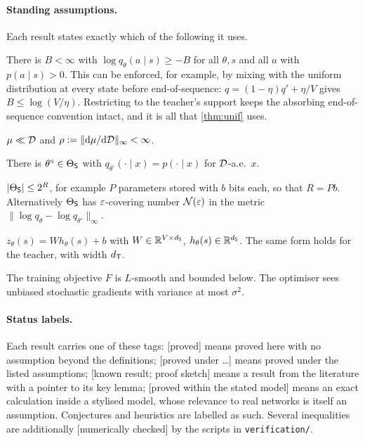 \paragraph{Standing assumptions.}
Each result states exactly which of the following it uses.
\begin{assumption}\label{as:bounded}
There is $B<\infty$ with $\log q_\theta(a\mid s)\ge -B$ for all $\theta,s$ and all $a$ with $p(a\mid s)>0$. This can be
enforced, for example, by mixing with the uniform distribution at every state before end-of-sequence:
$q=(1-\eta)q'+\eta/V$ gives $B\le\log(V/\eta)$. Restricting to the teacher's support keeps the absorbing
end-of-sequence convention intact, and it is all that \cref{thm:unif} uses.
\end{assumption}
\begin{assumption}\label{as:shift}
$\mu\ll\mathcal{D}$ and $\rho:=\|\mathrm d\mu/\mathrm d\mathcal{D}\|_\infty<\infty$.
\end{assumption}
\begin{assumption}[Realisability]\label{as:real}
There is $\theta^\circ\in\Theta_{\mathsf{S}}$ with $q_{\theta^\circ}(\cdot\mid x)=p(\cdot\mid x)$ for $\mathcal{D}$-a.e.\ $x$.
\end{assumption}
\begin{assumption}\label{as:finite}
$|\Theta_{\mathsf{S}}|\le 2^R$, for example $P$ parameters stored with $b$ bits each, so that $R=Pb$. Alternatively
$\Theta_{\mathsf{S}}$ has $\varepsilon$-covering number $\mathcal{N}(\varepsilon)$ in the metric
$\|\log q_\theta-\log q_{\theta'}\|_\infty$.
\end{assumption}
\begin{assumption}\label{as:linear}
$z_\theta(s)=W h_\theta(s)+b$ with $W\in\mathbb{R}^{V\times d_{\mathsf{S}}}$, $h_\theta(s)\in\mathbb{R}^{d_{\mathsf{S}}}$. The same form holds for
the teacher, with width $d_{\mathsf{T}}$.
\end{assumption}
\begin{assumption}\label{as:opt}
The training objective $F$ is $L$-smooth and bounded below. The optimiser sees unbiased stochastic
gradients with variance at most $\sigma^2$.
\end{assumption}

\paragraph{Status labels.}
Each result carries one of these tags:
\textsf{[proved]} means proved here with no assumption beyond the definitions;
\textsf{[proved under \ldots]} means proved under the listed assumptions;
\textsf{[known result; proof sketch]} means a result from the literature with a pointer to its key lemma;
\textsf{[proved within the stated model]} means an exact calculation inside a stylised model, whose
relevance to real networks is itself an assumption.
Conjectures and heuristics are labelled as such. Several inequalities are additionally
\textsf{[numerically checked]} by the scripts in \texttt{verification/}.
